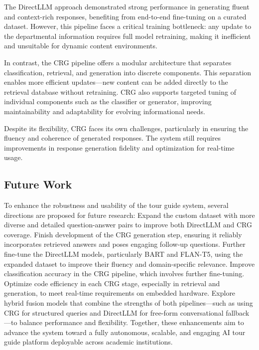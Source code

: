 \documentclass[conference]{IEEEtran}
\begin{document}
The DirectLLM approach demonstrated strong performance in generating fluent and context-rich responses, benefiting from end-to-end fine-tuning on a curated dataset. 
However, this pipeline faces a critical training bottleneck: any update to the departmental information requires full model retraining, making it inefficient and unsuitable for dynamic content environments.

In contrast, the CRG pipeline offers a modular architecture that separates classification, retrieval, and generation into discrete components. 
This separation enables more efficient updates—new content can be added directly to the retrieval database without retraining. 
CRG also supports targeted tuning of individual components such as the classifier or generator, improving maintainability and adaptability for evolving informational needs.

Despite its flexibility, CRG faces its own challenges, particularly in ensuring the fluency and coherence of generated responses. 
The system still requires improvements in response generation fidelity and optimization for real-time usage.

\subsection*{Future Work}
To enhance the robustness and usability of the tour guide system, several directions are proposed for future research:
Expand the custom dataset with more diverse and detailed question-answer pairs to improve both DirectLLM and CRG coverage.
Finish development of the CRG generation step, ensuring it reliably incorporates retrieved answers and poses engaging follow-up questions.
Further fine-tune the DirectLLM models, particularly BART and FLAN-T5, using the expanded dataset to improve their fluency and domain-specific relevance.
Improve classification accuracy in the CRG pipeline, which involves further fine-tuning.
Optimize code efficiency in each CRG stage, especially in retrieval and generation, to meet real-time requirements on embedded hardware.
Explore hybrid fusion models that combine the strengths of both pipelines—such as using CRG for structured queries and DirectLLM for free-form conversational fallback—to balance performance and flexibility.
Together, these enhancements aim to advance the system toward a fully autonomous, scalable, and engaging AI tour guide platform deployable across academic institutions.
\end{document}
